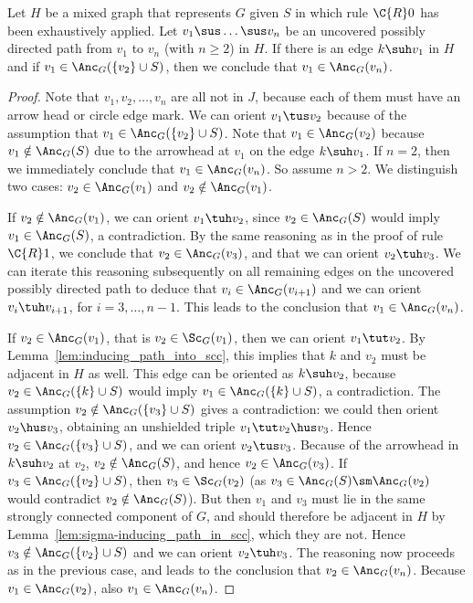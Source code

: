 \begin{Lem}\label{lem:upd_path}
Let $H$ be a mixed graph that represents $G$ given $S$ in which rule $\C{R}0$ has been exhaustively applied.
Let $v_1 \sus \dots \sus v_n$ be an uncovered possibly directed path from $v_1$ to $v_n$ (with $n \ge 2$) in $H$.
If there is an edge $k \suh v_1$ in $H$ and if $v_1 \in \Anc_G(\{v_2\} \cup S)$, then we conclude that $v_1 \in \Anc_G(v_n)$.
\end{Lem}
\begin{proof}
  Note that $v_1, v_2, \dots, v_n$ are all not in $J$, because each of them must have an arrow head or circle edge mark.
  We can orient $v_1 \tus v_2$ because of the assumption that $v_1 \in \Anc_G(\{v_2\} \cup S)$.
  Note that $v_1 \in \Anc_G(v_2)$ because $v_1 \notin \Anc_G(S)$ due to the arrowhead at $v_1$ on the edge $k \suh v_1$.
  If $n = 2$, then we immediately conclude that $v_1 \in \Anc_G(v_n)$.
  So assume $n > 2$.
  We distinguish two cases: $v_2 \in \Anc_G(v_1)$ and $v_2 \notin \Anc_G(v_1)$.

  If $v_2 \notin \Anc_G(v_1)$, we can orient $v_1 \tuh v_2$, since $v_2 \in \Anc_G(S)$ would imply $v_1 \in \Anc_G(S)$, a contradiction.
  By the same reasoning as in the proof of rule $\C{R}1$, we conclude that $v_2 \in \Anc_G(v_3)$, and that we can orient $v_2 \tuh v_3$.
  We can iterate this reasoning subsequently on all remaining edges on the uncovered possibly directed path to deduce that $v_i \in \Anc_G(v_{i+1})$ and we can orient $v_i \tuh v_{i+1}$, for $i = 3, \dots, n-1$.
  This leads to the conclusion that $v_1 \in \Anc_G(v_n)$.

  If $v_2 \in \Anc_G(v_1)$, that is $v_2 \in \Sc_G(v_1)$, then we can orient $v_1 \tut v_2$. 
  By Lemma~\ref{lem:inducing_path_into_scc}, this implies that $k$ and $v_2$ must be adjacent in $H$ as well. 
  This edge can be oriented as $k \suh v_2$, because $v_2 \in \Anc_G(\{k\} \cup S)$ would imply $v_1 \in \Anc_G(\{k\} \cup S)$, a contradiction.
  The assumption $v_2 \notin \Anc_G(\{v_3\} \cup S)$ gives a contradiction: we could then orient $v_2 \hus v_3$, obtaining an unshielded triple $v_1 \tut v_2 \hus v_3$.
  Hence $v_2 \in \Anc_G(\{v_3\} \cup S)$, and we can orient $v_2 \tus v_3$. 
  Because of the arrowhead in $k \suh v_2$ at $v_2$, $v_2 \notin \Anc_G(S)$, and hence $v_2 \in \Anc_G(v_3)$.
  If $v_3 \in \Anc_G(\{v_2\} \cup S)$, then $v_3 \in \Sc_G(v_2)$ (as $v_3 \in \Anc_G(S) \sm \Anc_G(v_2)$ would contradict $v_2 \notin \Anc_G(S)$).
  But then $v_1$ and $v_3$ must lie in the same strongly connected component of $G$, and should therefore be adjacent in $H$ by Lemma~\ref{lem:sigma-inducing_path_in_scc}, which they are not.
  Hence $v_3 \notin \Anc_G(\{v_2\} \cup S)$ and we can orient $v_2 \tuh v_3$.
  The reasoning now proceeds as in the previous case, and leads to the conclusion that $v_2 \in \Anc_G(v_n)$.
  Because $v_1 \in \Anc_G(v_2)$, also $v_1 \in \Anc_G(v_n)$.
\end{proof}

